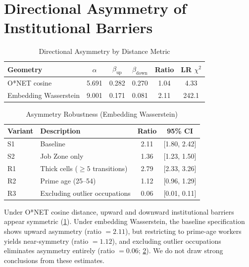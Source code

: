 \documentclass[12pt]{article}
\begin{document}
\section{Directional Asymmetry of Institutional Barriers}
\label{app:asymmetry}


\begin{table}[h!]
\centering
\caption{Directional Asymmetry by Distance Metric}
\label{tab:asymmetric-geometry}
\begin{tabular}{lccccc}
\toprule
\textbf{Geometry} & $\alpha$ & $\beta_{\mathrm{up}}$ & $\beta_{\mathrm{down}}$ & Ratio & LR $\chi^2$ \\
\midrule
O*NET cosine & 5.691 & 0.282 & 0.270 & 1.04 & 4.33 \\
Embedding Wasserstein & 9.001 & 0.171 & 0.081 & 2.11 & 242.1 \\
\bottomrule
\end{tabular}
\end{table}


\begin{table}[h!]
\centering
\caption{Asymmetry Robustness (Embedding Wasserstein)}
\label{tab:asymmetric-robustness}
\begin{tabular}{llcc}
\toprule
\textbf{Variant} & \textbf{Description} & \textbf{Ratio} & \textbf{95\% CI} \\
\midrule
S1 & Baseline & 2.11 & [1.80, 2.42] \\
S2 & Job Zone only & 1.36 & [1.23, 1.50] \\
R1 & Thick cells ($\geq 5$ transitions) & 2.79 & [2.33, 3.26] \\
R2 & Prime age (25--54) & 1.12 & [0.96, 1.29] \\
R3 & Excluding outlier occupations & 0.06 & [0.01, 0.11] \\
\bottomrule
\end{tabular}
\end{table}


Under O*NET cosine distance, upward and downward institutional barriers appear symmetric (\cref{tab:asymmetric-geometry}). Under embedding Wasserstein, the baseline specification shows upward asymmetry (ratio $= 2.11$), but restricting to prime-age workers yields near-symmetry (ratio $= 1.12$), and excluding outlier occupations eliminates asymmetry entirely (ratio $= 0.06$; \cref{tab:asymmetric-robustness}). We do not draw strong conclusions from these estimates.




\end{document}
